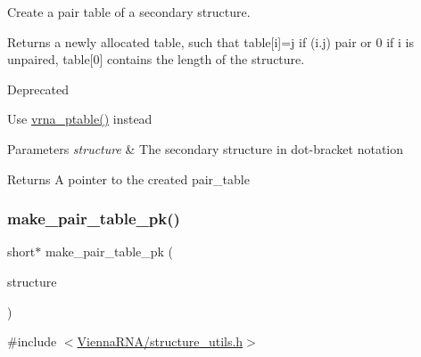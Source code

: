 Create a pair table of a secondary structure. 

Returns a newly allocated table, such that table\mbox{[}i\mbox{]}=j if (i.\+j) pair or 0 if i is unpaired, table\mbox{[}0\mbox{]} contains the length of the structure.

\begin{DoxyRefDesc}{Deprecated}
\item[\mbox{\hyperlink{deprecated__deprecated000140}{Deprecated}}]Use \mbox{\hyperlink{group__struct__utils_gae829fb8bb7f694c12a9c0bbc34c77c60}{vrna\+\_\+ptable()}} instead\end{DoxyRefDesc}



\begin{DoxyParams}{Parameters}
{\em structure} & The secondary structure in dot-\/bracket notation \\
\hline
\end{DoxyParams}
\begin{DoxyReturn}{Returns}
A pointer to the created pair\+\_\+table 
\end{DoxyReturn}
\mbox{\label{group__struct__utils_gade238ede0090a5ca07f9b4dc0eea8a42}} 
\subsubsection{\texorpdfstring{make\+\_\+pair\+\_\+table\+\_\+pk()}{make\_pair\_table\_pk()}}
{\footnotesize\ttfamily short$\ast$ make\+\_\+pair\+\_\+table\+\_\+pk (\begin{DoxyParamCaption}\item[{const char $\ast$}]{structure }\end{DoxyParamCaption})}



{\ttfamily \#include $<$\mbox{\hyperlink{structure__utils_8h}{Vienna\+R\+N\+A/structure\+\_\+utils.\+h}}$>$}

\mbox{\label{group__struct__utils_gafeaa6d68eef3a99d0a7aa08aa91c6601}} 
